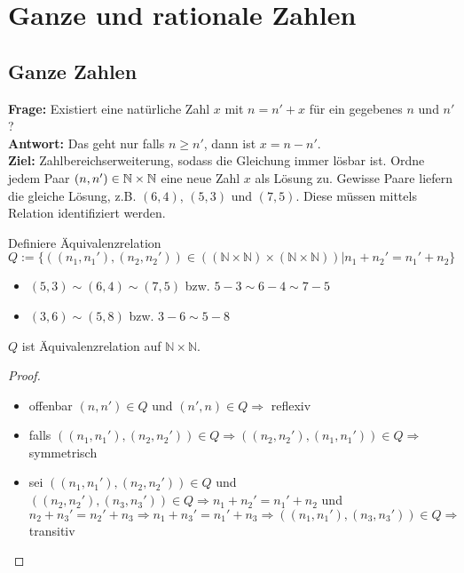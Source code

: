 \section{Ganze und rationale Zahlen}
\subsection{Ganze Zahlen}
\textbf{Frage:} Existiert eine natürliche Zahl $x$ mit $n=n'+x$ für ein gegebenes $n$ und $n'$? \\
\textbf{Antwort:} Das geht nur falls $n\ge n'$, dann ist $x=n-n'$. \\
\textbf{Ziel:} Zahlbereichserweiterung, sodass die Gleichung immer lösbar ist. Ordne jedem Paar 
$(n,n')\in\mathbb{N}\times\mathbb{N}$ eine neue Zahl $x$ als Lösung zu. Gewisse Paare liefern die gleiche 
Lösung, z.B. $(6,4)$, $(5,3)$ und $(7,5)$. Diese müssen mittels Relation identifiziert werden.

\begin{definition}
	Definiere Äquivalenzrelation $Q:=\{ ((n_1,n_1'),(n_2,n_2'))\in((\mathbb{N}\times\mathbb{N})\times(\mathbb{N}\times\mathbb{N})) | n_1+n_2' = n_1' + n_2 \}$
\end{definition}

\begin{example}
	\begin{itemize}
		\item $(5,3)\sim (6,4) \sim (7,5)$ bzw. $5-3\sim 6-4\sim 7-5$
		\item $(3,6)\sim (5,8)$ bzw. $3-6\sim 5-8$
	\end{itemize}
\end{example}

\begin{proposition}
	$Q$ ist Äquivalenzrelation auf $\mathbb{N}\times\mathbb{N}$.
\end{proposition}
\begin{proof}
	\begin{itemize}
		\item offenbar $(n,n')\in Q$ und $(n',n)\in Q\Rightarrow$ reflexiv
		\item falls $((n_1,n_1'),(n_2,n_2'))\in Q\Rightarrow ((n_2,n_2'),(n_1,n_1'))\in Q\Rightarrow$ symmetrisch
		\item sei $((n_1,n_1'),(n_2,n_2'))\in Q$ und $((n_2,n_2'),(n_3,n_3'))\in Q\Rightarrow n_1+n_2'=n_1'+n_2$ und $n_2+n_3'=n_2'+n_3\Rightarrow n_1+n_3'=n_1'+n_3\Rightarrow ((n_1,n_1'),(n_3,n_3'))\in Q\Rightarrow$ transitiv
	\end{itemize}
\end{proof}

